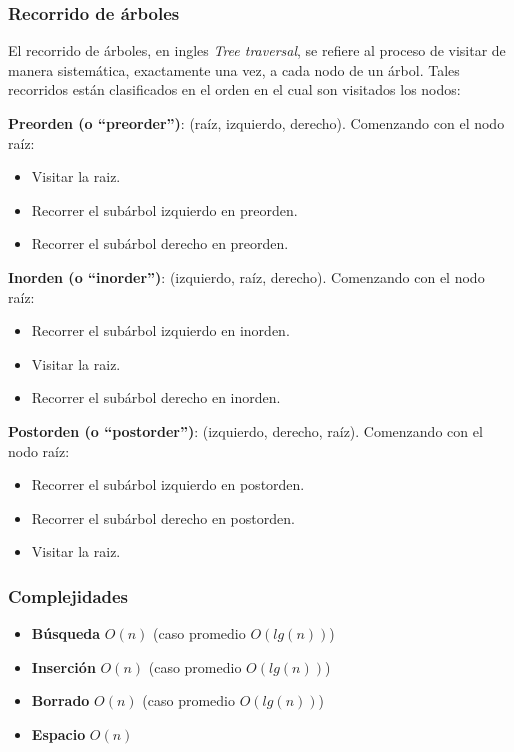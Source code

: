\subsubsection{Recorrido de \'arboles}

El recorrido de \'arboles, en ingles \textit{Tree traversal}, se refiere al proceso de visitar de manera sistem\'atica, exactamente una vez, a cada nodo de un \'arbol. Tales recorridos est\'an clasificados en el orden en el cual son visitados los nodos:

\textbf{Preorden (o ``preorder'')}: (ra\'iz, izquierdo, derecho). Comenzando con el nodo ra\'iz:
\begin{itemize}
 \item Visitar la raiz.
 \item Recorrer el sub\'arbol izquierdo en preorden.
 \item Recorrer el sub\'arbol derecho en preorden.
\end{itemize}

\textbf{Inorden (o ``inorder'')}:  (izquierdo, ra\'iz, derecho). Comenzando con el nodo ra\'iz:
\begin{itemize}
 \item Recorrer el sub\'arbol izquierdo en inorden.
 \item Visitar la raiz.
 \item Recorrer el sub\'arbol derecho en inorden.
\end{itemize}

\textbf{Postorden (o ``postorder'')}:  (izquierdo, derecho, ra\'iz). Comenzando con el nodo ra\'iz:
\begin{itemize}
 \item Recorrer el sub\'arbol izquierdo en postorden.
 \item Recorrer el sub\'arbol derecho en postorden.
 \item Visitar la raiz.
\end{itemize}

\subsubsection{Complejidades}

\begin{itemize}
 \item \textbf{B\'usqueda} $O(n)$ (caso promedio $O(lg(n))$)
 \item \textbf{Inserci\'on} $O(n)$ (caso promedio $O(lg(n))$)
 \item \textbf{Borrado} $O(n)$ (caso promedio $O(lg(n))$)
 \item \textbf{Espacio} $O(n)$
\end{itemize}

